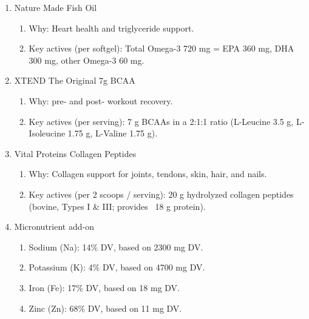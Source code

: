 \begin{enumerate}
    \item Nature Made Fish Oil
    \begin{enumerate}
        \item Why: Heart health and triglyceride support.
        \item Key actives (per softgel): Total Omega-3 720 mg = EPA 360 mg, DHA 300 mg, other Omega-3 60 mg.
    \end{enumerate}
    
    \item XTEND The Original 7g BCAA 
    \begin{enumerate}
        \item Why: pre- and post- workout recovery.
        \item Key actives (per serving): 7 g BCAAs in a 2:1:1 ratio (L-Leucine 3.5 g, L-Isoleucine 1.75 g, L-Valine 1.75 g).
    \end{enumerate}
    
    \item Vital Proteins Collagen Peptides
    \begin{enumerate}
        \item Why: Collagen support for joints, tendons, skin, hair, and nails.
        \item Key actives (per 2 scoops / serving): 20 g hydrolyzed collagen peptides (bovine, Types I \& III; provides ~18 g protein).
    \end{enumerate}

    \item Micronutrient add-on 
    \begin{enumerate}
        \item Sodium (Na): 14\% DV, based on 2300 mg DV.
        \item Potassium (K): 4\% DV, based on 4700 mg DV.
        \item Iron (Fe): 17\% DV, based on 18 mg DV. 
        \item Zinc (Zn): 68\% DV, based on 11 mg DV.
    \end{enumerate} 
\end{enumerate}
